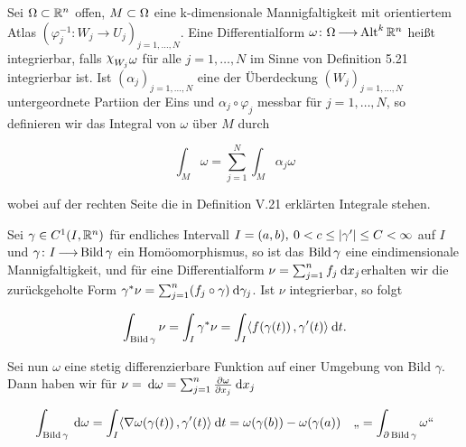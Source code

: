 \documentclass[skript.tex]{subfiles}
\begin{document}
		\begin{defin}
			Sei $ \Omega \subset {\mathbb{R}^n}$ offen, $M \subset \Omega$ eine k-dimensionale Mannigfaltigkeit mit orientiertem Atlas $(\varphi_j^{-1} \colon W_j \to U_j)_{j = 1, \dots, N}$. Eine Differentialform $\omega \colon \Omega \kern -1pt \longrightarrow \kern -1pt \operatorname{Alt}^k {\mathbb{R}^n}$ heißt integrierbar, falls $\rchi_{W_j} \omega$ für alle 
			$j = 1, \dots , N$ im Sinne von Definition 5.21 integrierbar ist. Ist $(\alpha_j)_{j=1, \dots, N}$ eine der Überdeckung $(W_j)_{j = 1, \dots, N}$ untergeordnete Partiion der Eins und $\alpha_j \circ \varphi_j$ messbar für $j = 1, \dots , N$, so definieren wir das Integral von $\omega$ über $M$ durch 
			
			\begin{equation*}
			\int_M \omega = \sum_{j=1}^{N} \int_M \alpha_j \omega
			\end{equation*}
			
			wobei auf der rechten Seite die in Definition V.21 erklärten Integrale stehen.
		\end{defin}
	
		\begin{bsp}[Kurvenintegrale]
			Sei $\gamma \in C^1(I, {\mathbb{R}^n})$ für endliches Intervall $I = (a,b), \: 0<c \leq \left| \gamma ' \right| \leq C < \infty$ auf $I$ und $ \gamma \colon I \kern -1pt \longrightarrow \kern -1pt \operatorname{Bild}\gamma$ ein Homöomorphismus, so ist das $\operatorname{Bild}\gamma$ eine eindimensionale Mannigfaltigkeit, und für eine Differentialform $\nu = \sum_{j=1}^{n} f_j \: \mathrm{d} x_j$erhalten wir die zurückgeholte Form $\gamma^* \nu = \sum_{j=1}^{n} (f_j \circ \gamma) \: \mathrm{d} \gamma_j$. Ist $\nu$ integrierbar, so folgt
			
			\begin{equation*}
			\int_{\operatorname{Bild} \gamma} \nu = \int_I \gamma^* \nu = \int_I \langle f(\gamma(t))\,{,}\,\gamma'(t) \rangle \: \mathrm{d} t.
			\end{equation*}
			
			Sei nun $\omega$ eine stetig differenzierbare Funktion auf einer Umgebung von Bild $\gamma$. Dann haben wir für $\nu = \: \mathrm{d} \omega= \sum_{j=1}^{n} \frac{\partial \omega}{\partial x_j} \: \mathrm{d} x_j$
			
			\begin{equation*}
			\int_{\operatorname{Bild}\gamma} \: \mathrm{d} \omega = \int_I \langle \nabla \omega( \gamma(t))\,{,}\,\gamma' (t) \rangle \: \mathrm{d} t = \omega(\gamma(b)) - \omega(\gamma(a)) \quad\text{„}= \int_{\partial \operatorname{Bild} \gamma} \omega\text{“}
			\end{equation*}
			
			\end{bsp}
			
\end{document}
